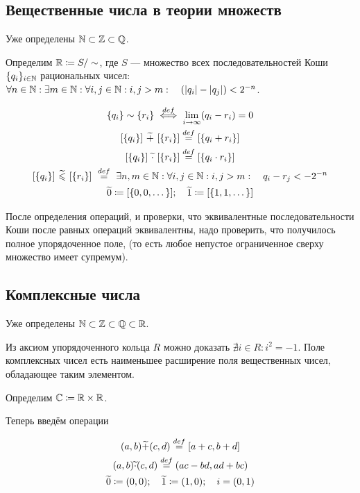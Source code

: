 \documentclass[a4paper]{report}
\begin{document}
    \subsection{Вещественные числа в теории множеств}
    Уже определены $\mathbb{N} \subset \mathbb{Z} \subset \mathbb{Q}$.

    Определим $\mathbb{R} \coloneqq S/\sim$, где $S$ --- множество всех последовательностей Коши $\{q_i\}_{i \in \mathbb{N}}$ рациональных чисел: $\forall n \in \mathbb{N}: \exists m \in \mathbb{N}: \forall i, j \in \mathbb{N} : i, j > m: \quad (|q_i| - |q_j|) < 2^{-n}$.

    \begin{gather*}
        \{q_i\} \sim \{r_i\} \overset{def}{\iff} \lim\limits_{i \rightarrow \infty}(q_i - r_i) = 0\\
        [\{q_i\}]~\widetilde{+}~[\{r_i\}] \overset{def}{=} [\{q_i + r_i\}]\\
        [\{q_i\}]~\widetilde{\cdot}~[\{r_i\}] \overset{def}{=} [\{q_i \cdot r_i\}]\\
        [\{q_i\}]~\widetilde{\leqslant}~[\{r_i\}]~ \overset{def}{=} ~\exists n, m \in \mathbb{N}: \forall i, j \in \mathbb{N}:i, j > m:\quad q_i - r_j < -2^{-n}\\
        \widetilde{0} \coloneqq [\{0, 0, \dots \}]; \quad \widetilde{1} \coloneqq [\{1, 1, \dots \}]\\
    \end{gather*}

    После определения операций, и проверки, что эквивалентные последовательности Коши после равных операций эквивалентны, надо проверить, что получилось полное упорядоченное поле, (то есть любое непустое ограниченное сверху множество имеет супремум).

    \subsection{Комплексные числа}
    Уже определены $\mathbb{N} \subset \mathbb{Z} \subset \mathbb{Q} \subset \mathbb{R}$.

    Из аксиом упорядоченного кольца $R$ можно доказать $\nexists i \in R : i^2 = -1$.
    Поле комплексных чисел есть наименьшее расширение поля вещественных чисел, обладающее таким элементом.

    Определим $\mathbb{C} \coloneqq \mathbb{R} \times \mathbb{R}$.

    Теперь введём операции

    \begin{gather*}
    (a, b)
        \widetilde{+} (c, d) \overset{def}{=} [a + c, b + d]\\
        (a, b) \widetilde{\cdot} (c, d) \overset{def}{=} (ac - bd, ad + bc)\\
        \widetilde{0} \coloneqq (0, 0); \quad \widetilde{1} \coloneqq (1, 0); \quad i = (0, 1)\\
    \end{gather*}
\end{document}
